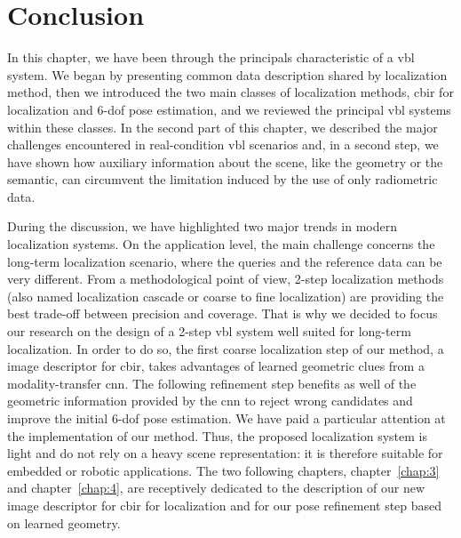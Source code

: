 \section{Conclusion}

In this chapter, we have been through the principals characteristic of a \ac{vbl} system. We began by presenting common data description shared by localization method, then we introduced the two main classes of localization methods, \ac{cbir} for localization and 6-\ac{dof} pose estimation, and we reviewed the principal \ac{vbl} systems within these classes. In the second part of this chapter, we described the major challenges encountered in real-condition \ac{vbl} scenarios and, in a second step, we have shown how auxiliary information about the scene, like the geometry or the semantic, can circumvent the limitation induced by the use of only radiometric data.

During the discussion, we have highlighted two major trends in modern localization systems. On the application level, the main challenge concerns the long-term localization scenario, where the queries and the reference data can be very different. From a methodological point of view, 2-step localization methods (also named localization cascade or coarse to fine localization) are providing the best trade-off between precision and coverage. That is why we decided to focus our research on the design of a 2-step \ac{vbl} system well suited for long-term localization. In order to do so, the first coarse localization step of our method, a image descriptor for \ac{cbir}, takes advantages of learned geometric clues from a modality-transfer \ac{cnn}. The following refinement step benefits as well of the geometric information provided by the \ac{cnn} to reject wrong candidates and improve the initial 6-\ac{dof} pose estimation. We have paid a particular attention at the implementation of our method. Thus, the proposed localization system is light and do not rely on a heavy scene representation: it is therefore suitable for embedded or robotic applications. The two following chapters, chapter~\ref{chap:3} and chapter~\ref{chap:4}, are receptively dedicated to the description of our new image descriptor for \ac{cbir} for localization and for our pose refinement step based on learned geometry.



